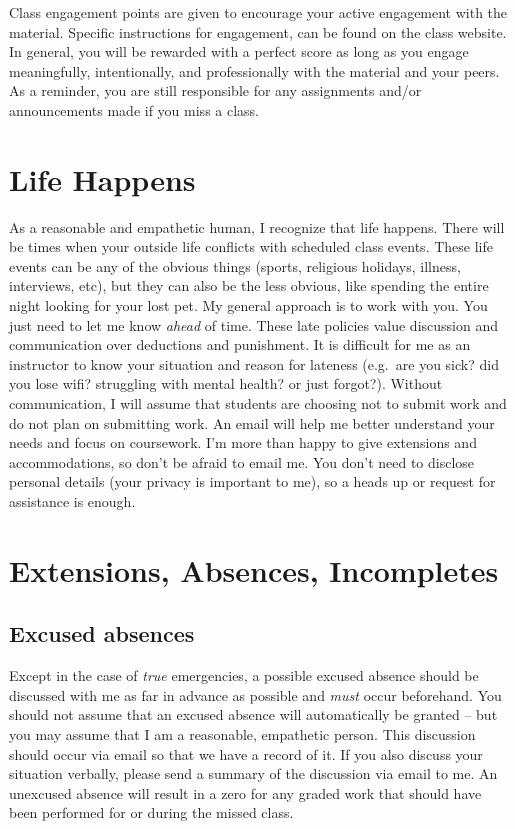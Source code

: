 Class engagement points are given to encourage your active engagement with the material.
Specific instructions for engagement, can be found on the class website. In general, you will be rewarded with a perfect score as long as you engage meaningfully, intentionally, and professionally with the material and your peers. As a reminder, you are still responsible for any assignments and/or announcements made if you miss a class.

\hypertarget{life-happens}{%
\section{Life Happens}\label{life-happens}}

As a reasonable and empathetic human, I recognize that life happens.
There will be times when your outside life conflicts with scheduled class events.
These life events can be any of the obvious things (sports, religious holidays, illness, interviews, etc), but they can also be the less obvious, like spending the entire night looking for your lost pet.
My general approach is to work with you. You just need to let me know \emph{ahead} of time.
These late policies value discussion and communication over deductions and punishment.
It is difficult for me as an instructor to know your situation and reason for lateness (e.g.~are you sick? did you lose wifi? struggling with mental health? or just forgot?).
Without communication, I will assume that students are choosing not to submit work and do not plan on submitting work.
An email will help me better understand your needs and focus on coursework.
I'm more than happy to give extensions and accommodations, so don't be afraid to email me.
You don't need to disclose personal details (your privacy is important to me), so a heads up or request for assistance is enough.

\hypertarget{extensions-absences-incompletes}{%
\section{Extensions, Absences, Incompletes}\label{extensions-absences-incompletes}}

\hypertarget{excused-absences}{%
\subsection{Excused absences}\label{excused-absences}}

Except in the case of \emph{true} emergencies, a possible excused absence should be discussed with me as far in advance as possible and \emph{must} occur beforehand.
You should not assume that an excused absence will automatically be granted -- but you may assume that I am a reasonable, empathetic person.
This discussion should occur via email so that we have a record of it.
If you also discuss your situation verbally, please send a summary of the discussion via email to me.
An unexcused absence will result in a zero for any graded work that should have been performed for or during the missed class.

